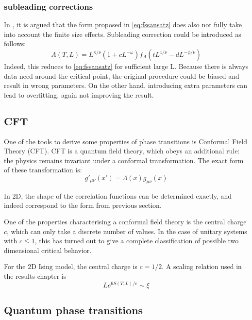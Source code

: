 \subsubsection{subleading corrections}
In \cite{Beach2005}, it is argued that the form proposed in \cref{eq:fssansatz} does also not fully take into account the finite size effects. Subleading correction could be introduced as follows:
\begin{equation}\label{ea:subleadparam}
    A(T,L) = L^{\kappa / \nu} ( 1+c L^{-\omega} ) f_A( t L ^{1/ \nu} -d L^{-\phi/\nu} )
\end{equation}
Indeed, this reduces to \cref{eq:fssansatz} for sufficient large L. Because there is always data need around the critical point, the original procedure could be biased and result in wrong parameters. On the other hand, introducing extra parameters can lead to overfitting, again not improving the result.

\subsection{CFT}\label{crit:cft}

One of the tools to derive some properties of phase transitions is Conformal Field Theory (CFT). CFT is a quantum field theory, which obeys an additional rule: the physics remains invariant under a conformal transformation. The exact form of these transformation is:
\begin{equation}
    g'_{\mu \nu}(x') = \Lambda(x) g_{\mu \nu}(x)
\end{equation}

In 2D, the shape of the correlation functions can be determined exactly, and indeed correspond to the form from previous section.

One of the properties characterising a conformal field theory is the central charge $c$, which can only take a discrete number of values.  In the case of unitary systems with $c \leq  1$, this has  turned out to give a complete classification of possible two dimensional critical behavior. \cite{Ginsparg1988}

For the 2D Ising model, the central charge is $c=1/2$. A scaling relation used in the results chapter is \cite{Calabrese}
\begin{equation}
    L e^{  6 S( T,L ) /c }  \sim   \xi
\end{equation}

\subsection{Quantum phase transitions}

